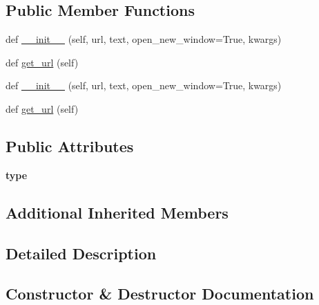 \subsection*{Public Member Functions}
\begin{DoxyCompactItemize}
\item 
def \hyperlink{classremi_1_1gui_1_1Link_a48356d0197b655fda2b1fd9f4686dbbf}{\+\_\+\+\_\+init\+\_\+\+\_\+} (self, url, text, open\+\_\+new\+\_\+window=True, kwargs)
\item 
def \hyperlink{classremi_1_1gui_1_1Link_acb6497a6b878c0ccdd68acacc1efc9fb}{get\+\_\+url} (self)
\item 
def \hyperlink{classremi_1_1gui_1_1Link_a48356d0197b655fda2b1fd9f4686dbbf}{\+\_\+\+\_\+init\+\_\+\+\_\+} (self, url, text, open\+\_\+new\+\_\+window=True, kwargs)
\item 
def \hyperlink{classremi_1_1gui_1_1Link_acb6497a6b878c0ccdd68acacc1efc9fb}{get\+\_\+url} (self)
\end{DoxyCompactItemize}
\subsection*{Public Attributes}
\begin{DoxyCompactItemize}
\item 
{\bfseries type}\hypertarget{classremi_1_1gui_1_1Link_af76dff7c49ac25c591e17d7024d49e25}{}\label{classremi_1_1gui_1_1Link_af76dff7c49ac25c591e17d7024d49e25}

\end{DoxyCompactItemize}
\subsection*{Additional Inherited Members}


\subsection{Detailed Description}
\begin{DoxyVerb}\end{DoxyVerb}
 

\subsection{Constructor \& Destructor Documentation}
